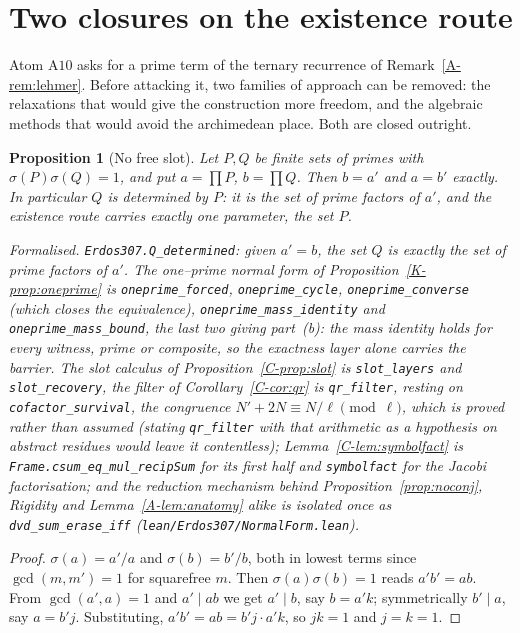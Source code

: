 \documentclass[11pt]{article}
\newtheorem{proposition}[theorem]{Proposition}
\theoremstyle{definition}
\begin{document}
\section{Two closures on the existence route}\label{sec:exclosure}

Atom $\mathrm{A}10$ asks for a prime term of the ternary recurrence of
Remark~\textup{\ref{A-rem:lehmer}}. Before attacking it, two families of approach can be removed:
the relaxations that would give the construction more freedom, and the algebraic methods that
would avoid the archimedean place. Both are closed outright.

\begin{proposition}[No free slot]\label{prop:nofreeslot}
Let $P,Q$ be finite sets of primes with $\sigma(P)\sigma(Q)=1$, and put $a=\prod P$, $b=\prod Q$.
Then $b=a'$ and $a=b'$ exactly. In particular $Q$ is \emph{determined} by $P$: it is the set of
prime factors of $a'$, and the existence route carries exactly one parameter, the set $P$.

\textup{Formalised.} \texttt{Erdos307.Q\_determined}: given $a'=b$, the set $Q$ is exactly the set of
prime factors of $a'$. The one--prime normal form of Proposition~\ref{K-prop:oneprime} is
\texttt{oneprime\_forced}, \texttt{oneprime\_cycle}, \texttt{oneprime\_converse}
\textup{(}which closes the equivalence\textup{)},
\texttt{oneprime\_mass\_identity} and \texttt{oneprime\_mass\_bound}, the last two giving
part~\textup{(b)}: the mass identity holds for
\emph{every} witness, prime or composite, so the exactness layer alone carries the barrier. The slot
calculus of Proposition~\ref{C-prop:slot} is \texttt{slot\_layers} and \texttt{slot\_recovery}, the
filter of Corollary~\ref{C-cor:qr} is \texttt{qr\_filter}, resting on \texttt{cofactor\_survival},
the congruence $N'+2N\equiv N/\ell\pmod\ell$, which is proved rather than assumed (stating \texttt{qr\_filter} with that arithmetic as a hypothesis on abstract residues would leave it contentless); Lemma~\ref{C-lem:symbolfact} is \texttt{Frame.csum\_eq\_mul\_recipSum} for its first half
and \texttt{symbolfact} for the Jacobi factorisation; and the reduction mechanism behind
Proposition~\ref{prop:noconj}, Rigidity and Lemma~\ref{A-lem:anatomy} alike is isolated once as
\texttt{dvd\_sum\_erase\_iff} \textup{(\texttt{lean/Erdos307/NormalForm.lean})}.
\end{proposition}
\begin{proof}
$\sigma(a)=a'/a$ and $\sigma(b)=b'/b$, both in lowest terms since $\gcd(m,m')=1$ for squarefree
$m$. Then $\sigma(a)\sigma(b)=1$ reads $a'b'=ab$. From $\gcd(a',a)=1$ and $a'\mid ab$ we get
$a'\mid b$, say $b=a'k$; symmetrically $b'\mid a$, say $a=b'j$. Substituting,
$a'b'=ab=b'j\cdot a'k$, so $jk=1$ and $j=k=1$.
\end{proof}
\end{document}
